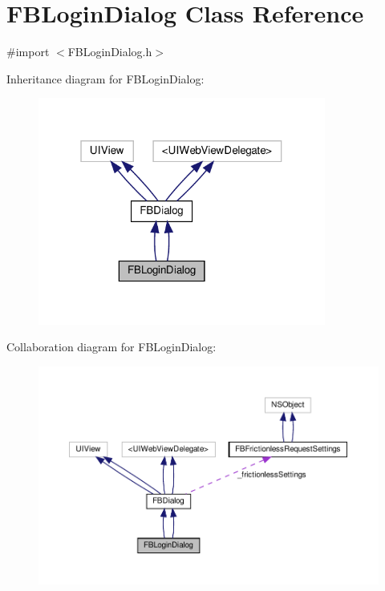 \hypertarget{interfaceFBLoginDialog}{}\section{F\+B\+Login\+Dialog Class Reference}
\label{interfaceFBLoginDialog}


{\ttfamily \#import $<$F\+B\+Login\+Dialog.\+h$>$}



Inheritance diagram for F\+B\+Login\+Dialog\+:
\nopagebreak
\begin{figure}[H]
\begin{center}
\leavevmode
\includegraphics[width=268pt]{interfaceFBLoginDialog__inherit__graph}
\end{center}
\end{figure}


Collaboration diagram for F\+B\+Login\+Dialog\+:
\nopagebreak
\begin{figure}[H]
\begin{center}
\leavevmode
\includegraphics[width=350pt]{interfaceFBLoginDialog__coll__graph}
\end{center}
\end{figure}
